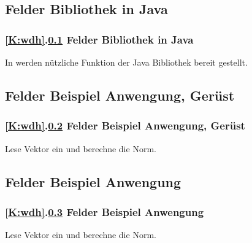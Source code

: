 \documentclass[9pt,german]{beamer}%
\begin{document}
\def\stitle{Felder Bibliothek in Java}
\subsection{\stitle}\label{S:bequem}
\begin{frame}[t]%
  \frametitle{\ref{K:wdh}.\ref{S:bequem} \stitle}
\medskip

In  werden n\"utzliche Funktion der Java Bibliothek bereit gestellt.


\end{frame}


\def\stitle{Felder Beispiel Anwengung, Ger\"ust}
\subsection{\stitle}\label{S:BeispielG}
\begin{frame}[t]%
  \frametitle{\ref{K:wdh}.\ref{S:BeispielG} \stitle}
\medskip

Lese Vektor ein und berechne die Norm.


\end{frame}


\def\stitle{Felder Beispiel Anwengung}
\subsection{\stitle}\label{S:Beispiel}
\begin{frame}[t]%
  \frametitle{\ref{K:wdh}.\ref{S:Beispiel} \stitle}
\medskip

Lese Vektor ein und berechne die Norm.


\end{frame}
\end{document}
